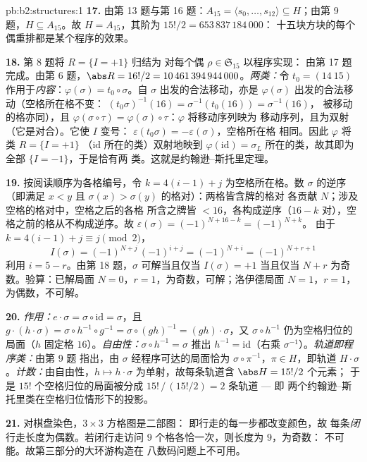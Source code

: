 \begin{solution}{pb:b2:structures:1}
\textbf{17.} 由第 13 题与第 16 题：$A_{15} = \langle s_0, \dots,
s_{12}\rangle \subseteq H$；由第 9 题，$H \subseteq A_{15}$。故
$H = A_{15}$，其阶为 $15!/2 = 653\,837\,184\,000$：
十五块方块的每个偶重排都是某个程序的效果。

\textbf{18.} 第 8 题将 $R = \{I = +1\}$ 归结为
对每个偶 $\rho \in \mathfrak{S}_{15}$ 以程序实现：
由第 17 题完成。由第 6 题，$\abs R = 16!/2 =
10\,461\,394\,944\,000$。\emph{两类：}令 $t_0 = (14\
15)$ 作用于\emph{内容}：$\varphi(\sigma) = t_0 \circ
\sigma$。自 $\sigma$ 出发的合法移动，亦是
$\varphi(\sigma)$ 出发的合法移动（空格所在格不变：
$(t_0\sigma)^{-1}(16) = \sigma^{-1}(t_0(16)) = \sigma^{-1}(16)$，
被移动的格亦同），且 $\varphi(\sigma \circ \tau)
= \varphi(\sigma) \circ \tau$：$\varphi$ 将移动序列映为
移动序列，且为双射（它是对合）。它使 $I$ 变号：
$\varepsilon(t_0\sigma) = -\varepsilon(\sigma)$，空格所在格
相同。因此 $\varphi$ 将类 $R = \{I = +1\}$
（$\mathrm{id}$ 所在的类）双射地映到 $\varphi(\mathrm{id})
= \sigma_L$ 所在的类，故其即为全部 $\{I = -1\}$，于是恰有两
类。这就是约翰逊--斯托里定理。

\textbf{19.} 按阅读顺序为各格编号，令 $k = 4(i -
1) + j$ 为空格所在格。数 $\sigma$ 的逆序
（即满足 $x < y$ 且 $\sigma(x) > \sigma(y)$ 的格对）：两格皆含牌的格对
各贡献 $N$；涉及空格的格对中，空格之后的各格
所含之牌皆 $< 16$，各构成逆序（$16 - k$
对），空格之前的格从不构成逆序。故
$\varepsilon(\sigma) = (-1)^{N + 16 - k} = (-1)^{N + k}$。
由于 $k = 4(i-1) + j \equiv j \pmod 2$，
\[
I(\sigma) = (-1)^{N + j}\,(-1)^{i + j} = (-1)^{N + i}
= (-1)^{N + r + 1}
\]
利用 $i = 5 - r$。由第 18 题，$\sigma$ 可解当且仅当
$I(\sigma) = +1$ 当且仅当 $N + r$ 为奇数。验算：已解局面 $N = 0$，$r
= 1$，为奇数，可解；洛伊德局面 $N = 1$，$r = 1$，为偶数，不可解。

\textbf{20.} \emph{作用：}$e \cdot \sigma = \sigma \circ
\mathrm{id} = \sigma$，且 $g \cdot (h \cdot \sigma) = \sigma
\circ h^{-1} \circ g^{-1} = \sigma \circ (gh)^{-1} = (gh) \cdot
\sigma$，又 $\sigma \circ h^{-1}$ 仍为空格归位的
局面（$h$ 固定格 $16$）。\emph{自由性：}$\sigma \circ
h^{-1} = \sigma$ 推出 $h^{-1} = \mathrm{id}$（右乘
$\sigma^{-1}$）。\emph{轨道即程序类：}由第 9 题
指出，由 $\sigma$ 经程序可达的局面恰为
$\sigma \circ \pi^{-1}$，$\pi \in H$，即轨道 $H
\cdot \sigma$。\emph{计数：}由自由性，$h \mapsto h \cdot
\sigma$ 为单射，故每条轨道含 $\abs H = 15!/2$ 个元素；
于是 $15!$ 个空格归位的局面被分成
$15!\,/\,(15!/2) = 2$ 条轨道 --- 即
两个约翰逊--斯托里类在空格归位情形下的投影。

\textbf{21.} 对棋盘染色，$3 \times 3$ 方格图是二部图：
即行走的每一步都改变颜色，故
每条\emph{闭}行走长度为偶数。若闭行走访问
$9$ 个格各恰一次，则长度为 $9$，为奇数：
不可能。故第三部分的大环游构造在
八数码问题上不可用。


\end{solution}
